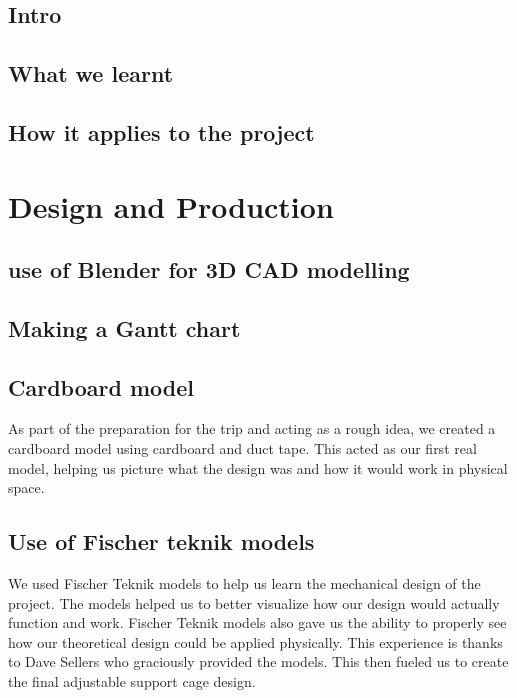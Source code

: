\documentclass[a4paper,10pt]{article}
\begin{document}
\subsection{Intro}

\subsection{What we learnt}

\subsection{How it applies to the project}


\section{Design and Production}

\subsection{use of Blender for 3D CAD modelling}
\subsection{Making a Gantt chart}
\subsection{Cardboard model}
As part of the preparation for the trip and acting as a rough idea, we created a cardboard model using cardboard and duct tape. This acted as our first real model, helping us picture what the design was and how it would work in physical space.

\subsection{Use of Fischer teknik models}
We used Fischer Teknik models to help us learn the mechanical design of the project. The models helped us to better visualize how our design would actually function and work. Fischer Teknik models also gave us the ability to properly see how our theoretical design could be applied physically. This experience is thanks to Dave Sellers who graciously provided the models. This then fueled us to create the final adjustable support cage design.
\end{document}
